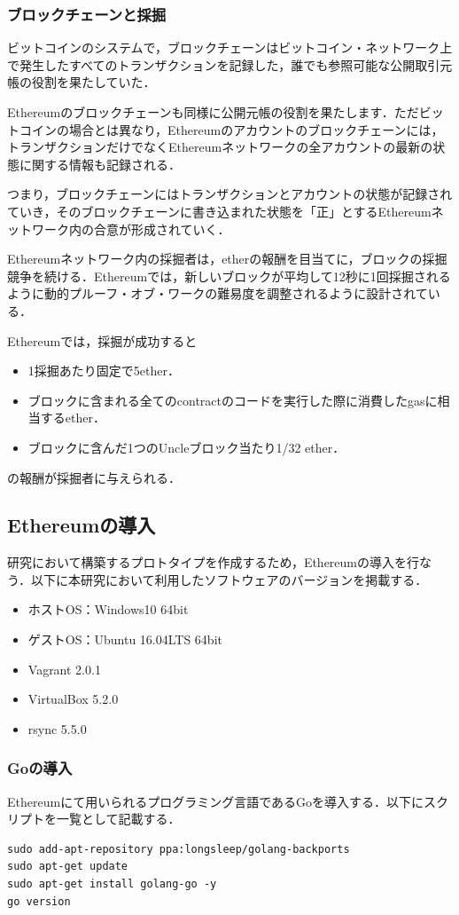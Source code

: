 \newpage

\subsubsection*{ブロックチェーンと採掘}
ビットコインのシステムで，ブロックチェーンはビットコイン・ネットワーク上で発生したすべてのトランザクションを記録した，誰でも参照可能な公開取引元帳の役割を果たしていた．

Ethereumのブロックチェーンも同様に公開元帳の役割を果たします．ただビットコインの場合とは異なり，Ethereumのアカウントのブロックチェーンには，トランザクションだけでなくEthereumネットワークの全アカウントの最新の状態に関する情報も記録される．

つまり，ブロックチェーンにはトランザクションとアカウントの状態が記録されていき，そのブロックチェーンに書き込まれた状態を「正」とするEthereumネットワーク内の合意が形成されていく．

Ethereumネットワーク内の採掘者は，etherの報酬を目当てに，ブロックの採掘競争を続ける．Ethereumでは，新しいブロックが平均して12秒に1回採掘されるように動的プルーフ・オブ・ワークの難易度を調整されるように設計されている．

Ethereumでは，採掘が成功すると
\begin{itemize}
\item 1採掘あたり固定で5ether．
\item ブロックに含まれる全てのcontractのコードを実行した際に消費したgasに相当するether．
\item ブロックに含んだ1つのUncleブロック当たり1/32 ether．
\end{itemize}
の報酬が採掘者に与えられる．

\newpage

\subsection{Ethereumの導入}
研究において構築するプロトタイプを作成するため，Ethereumの導入を行なう．以下に本研究において利用したソフトウェアのバージョンを掲載する．
\begin{itemize}
\item ホストOS：Windows10 64bit
\item ゲストOS：Ubuntu 16.04LTS 64bit
\item Vagrant 2.0.1
\item VirtualBox 5.2.0
\item rsync 5.5.0
\end{itemize}

\subsubsection{Goの導入}
Ethereumにて用いられるプログラミング言語であるGoを導入する．以下にスクリプトを一覧として記載する．
\begin{verbatim}
sudo add-apt-repository ppa:longsleep/golang-backports
sudo apt-get update
sudo apt-get install golang-go -y
go version
\end{verbatim}

